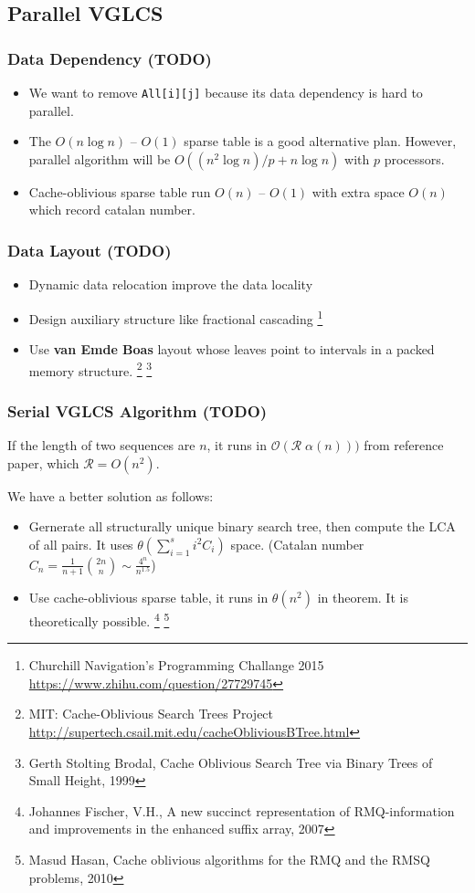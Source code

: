 \subsection{Parallel VGLCS}
\begin{frame}
	\frametitle{Data Dependency (TODO)}
	\begin{itemize}
		\setlength\itemsep{1em}
		\item We want to remove \texttt{All[i][j]} because its data dependency 
			is hard to parallel.
		\item The $O(n \log n)$ -- $O(1)$ sparse table is a good alternative plan. 
			However, parallel algorithm will be $O((n^2 \log n) / p + n \log n)$ with $p$ processors.
		\item Cache-oblivious sparse table run $O(n)$ -- $O(1)$ 
			with extra space $O(n)$ which record catalan number.
	\end{itemize}
\end{frame}

\begin{frame}
	\frametitle{Data Layout (TODO)}
	\begin{itemize}
		\setlength\itemsep{1em}
		\item Dynamic data relocation improve the data locality
		\item Design auxiliary structure like fractional cascading
		\footnote{Churchill Navigation's Programming Challange 2015 \url{https://www.zhihu.com/question/27729745}}
		\item Use \textbf{van Emde Boas} layout whose leaves point to intervals in a packed memory structure.
		\footnote{MIT: Cache-Oblivious Search Trees Project \url{http://supertech.csail.mit.edu/cacheObliviousBTree.html}}
		\footnote{Gerth Stolting Brodal, Cache Oblivious Search Tree via Binary Trees of Small Height, 1999}
	\end{itemize}
\end{frame}

\begin{frame}
	\frametitle{Serial VGLCS Algorithm (TODO)}
	If the length of two sequences are $n$, it runs in $\mathcal{O}(\mathcal{R} \; \alpha(n)))$ 
	from reference paper, which $\mathcal{R} = O(n^2)$.

	We have a better solution as follows:
	\begin{itemize}
		\setlength\itemsep{1em}
		\item Gernerate all structurally unique binary search tree, then compute the LCA of all pairs. 
			It uses $\theta(\sum_{i = 1}^{s} i^2 C_i)$ space.
			(Catalan number $C_n = \frac{1}{n+1} \binom{2n}{n} \sim \frac{4^n}{n^{1.5}}$)
		\item Use cache-oblivious sparse table, it runs in $\mathcal{\theta}(n^2)$ in theorem.
			It is theoretically possible.
		\footnote{Johannes Fischer, V.H., A new succinct representation of 
				RMQ-information and improvements in the enhanced suffix array, 2007}
		\footnote{Masud Hasan, Cache oblivious algorithms for the RMQ and the RMSQ problems, 2010}
	\end{itemize}
\end{frame}


